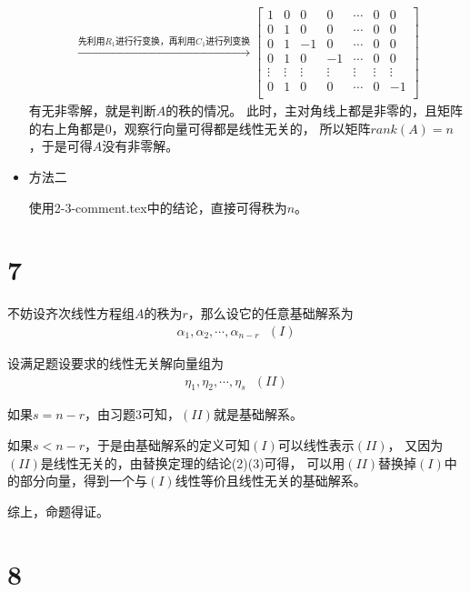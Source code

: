 \documentclass{article}
\begin{document}
\begin{itemize}
\begin{align*}
          \xrightarrow{\text{先利用$R_1$进行行变换，再利用$C_1$进行列变换}}
          \begin{bmatrix}
            1      & 0      & 0      & 0      & \cdots & 0      & 0      \\
            0      & 1      & 0      & 0      & \cdots & 0      & 0      \\
            0      & 1      & -1     & 0      & \cdots & 0      & 0      \\
            0      & 1      & 0      & -1     & \cdots & 0      & 0      \\
            \vdots & \vdots & \vdots & \vdots & \vdots & \vdots & \vdots \\
            0      & 1      & 0      & 0      & \cdots & 0      & -1     \\
          \end{bmatrix}
        \end{align*}
        有无非零解，就是判断$A$的秩的情况。
        此时，主对角线上都是非零的，且矩阵的右上角都是$0$，观察行向量可得都是线性无关的，
        所以矩阵$rank(A) = n$，于是可得$A$没有非零解。

  \item 方法二

        使用2-3-comment.tex中的结论，直接可得秩为$n$。
\end{itemize}


\section*{7}

不妨设齐次线性方程组$A$的秩为$r$，那么设它的任意基础解系为
\begin{align*}
  \alpha_1, \alpha_2, \cdots, \alpha_{n - r} \ \ \ (I)
\end{align*}

设满足题设要求的线性无关解向量组为
\begin{align*}
  \eta_1, \eta_2, \cdots, \eta_s \ \ \ (II)
\end{align*}

如果$s = n - r$，由习题3可知，$(II)$就是基础解系。

如果$s < n - r$，于是由基础解系的定义可知$(I)$可以线性表示$(II)$，
又因为$(II)$是线性无关的，由替换定理的结论(2)(3)可得，
可以用$(II)$替换掉$(I)$中的部分向量，得到一个与$(I)$线性等价且线性无关的基础解系。

综上，命题得证。

\section*{8}
\end{document}
